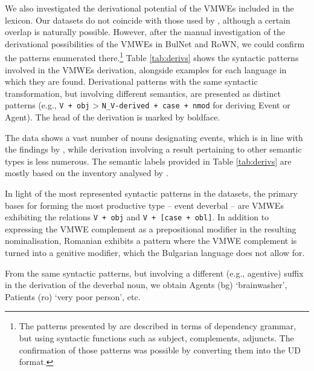 \documentclass[output=paper,colorlinks,citecolor=brown]{langscibook}
\begin{document}
We also investigated the derivational potential of the VMWEs included in the lexicon.
Our datasets do not coincide with those used by \citet{barbu-mititelu-leseva-2018}, although a certain overlap is naturally possible. However, after the manual investigation of the derivational possibilities of the VMWEs in BulNet and RoWN, we could confirm the patterns enumerated there.\footnote{The patterns presented by \citet{barbu-mititelu-leseva-2018} are described in terms of dependency grammar, but using syntactic functions such as subject, complements, adjuncts. The confirmation of those patterns was possible by converting them into the UD format.} 
Table \ref{tab:derivs} shows the syntactic patterns involved in the VMWEs derivation, alongside examples for each language in which they are found. Derivational patterns with the same syntactic transformation, but involving different semantics, are presented as distinct patterns (e.g., \texttt{V + obj} > \texttt{N\_V-derived + case + nmod} for deriving Event or Agent). The head of the derivation is marked by boldface.

The data shows a vast number of nouns designating events, which is in line with the findings by \citet{barbu-mititelu-leseva-2018}, while derivation involving a result pertaining to other semantic types is less numerous. %
The semantic labels provided in Table \ref{tab:derivs} are mostly based on the inventory analysed by \citet{barbu-mititelu-leseva-2018}.

In light of the most represented syntactic patterns in the datasets, the primary bases for forming the most productive type -- event deverbal -- are VMWEs exhibiting the relations \texttt{V + obj} and \texttt{V + [case + obl]}. In addition to expressing the VMWE complement as a prepositional modifier in the resulting nominalisation, Romanian exhibits a pattern where the VMWE complement is turned into a genitive modifier, which the Bulgarian language does not allow for. 

From the same syntactic patterns, but involving a different (e.g., agentive) suffix in the derivation of the deverbal noun, we obtain Agents (bg)  {`brainwasher'}, Patients (ro)  {`very poor person'}, etc.    
\end{document}
